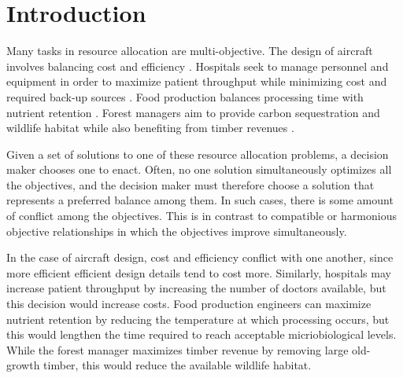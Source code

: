 
\section{Introduction}
\label{sec:intro}

Many tasks in resource allocation are multi-objective. The design of aircraft involves balancing cost and efficiency \cite{wang2014multi}. Hospitals seek to manage personnel and equipment in order to maximize patient throughput while minimizing cost and required back-up sources \cite{hutzschenreuter2009evolutionary}. Food production balances processing time with nutrient retention \cite{sendin2010efficient}. Forest managers aim to provide carbon sequestration and wildlife habitat while also benefiting from timber revenues \cite{toth2013ecosel}.

Given a set of solutions to one of these resource allocation problems, a decision maker chooses one to enact. Often, no one solution simultaneously optimizes all the objectives, and the decision maker must therefore choose a solution that represents a preferred balance among them. In such cases, there is some amount of conflict among the objectives. This is in contrast to compatible or harmonious objective relationships in which the objectives improve simultaneously.

In the case of aircraft design, cost and efficiency conflict with one another, since more efficient efficient design details tend to cost more. Similarly, hospitals may increase patient throughput by increasing the number of doctors available, but this decision would increase costs. Food production engineers can maximize nutrient retention by reducing the temperature at which processing occurs, but this would lengthen the time required to reach acceptable micriobiological levels. While the forest manager maximizes timber revenue by removing large old-growth timber, this would reduce the available wildlife habitat.%

